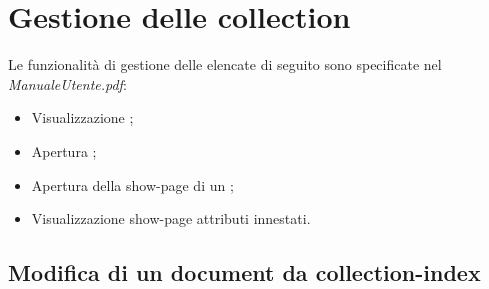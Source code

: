 \clearpage
\section{Gestione delle collection}
Le funzionalità di gestione delle  elencate di seguito sono specificate nel \emph{ManualeUtente.pdf}:
	\begin{itemize}
		\item Visualizzazione ;
		\item Apertura ;
		\item Apertura della show-page di un ;
		\item Visualizzazione show-page attributi innestati.
	\end{itemize}
	

	\subsection{Modifica di un document da collection-index} %
	\label{modificadocumentdacollectionindex}
